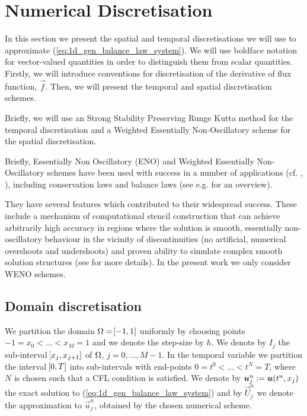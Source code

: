 \documentclass{amsart}
\theoremstyle{definition}
\theoremstyle{remark}
\numberwithin{equation}{section}
\begin{document}
\section{Numerical Discretisation}
In this section we present the spatial and temporal discretisations we will use to approximate (\ref{eq:1d_gen_balance_law_system}).   We will use boldface notation for  vector-valued quantities in order to distinguish them from scalar quantities.  Firstly, we will introduce conventions for discretisation of the derivative of flux function, $\vec{f}$.  Then, we will present the temporal and spatial discretisation schemes.  

Briefly, we will use an Strong Stability Preserving Runge Kutta method for the temporal discretisation and a Weighted Essentially Non-Oscillatory scheme for the spatial discretisation.  

Briefly, Essentially Non Oscillatory (ENO) and Weighted Essentially Non-Oscillatory schemes have been used with success in a number of applications (cf. \cite{jiang1996efficient}, \cite{shu1998essentially}), including conservation laws and balance laws (see e.g. \cite{shu2020essentially} for an overview).  

They have several features which contributed to their widespread success.  These include a mechanism of computational stencil construction that can achieve arbitrarily high accuracy in regions where the solution is smooth, essentially non-oscillatory behaviour in the vicinity of discontinuities (no artificial, numerical overshoots and undershoots) and proven ability to simulate complex smooth solution structures (see \cite{shu1998essentially} for more details).  In the present work we only consider WENO schemes.

\subsection{Domain discretisation}
We partition the domain $\Omega=\!\left[{-1,1}\right]$ uniformly by choosing points $-1=x_0<\dots<x_M=1$ and we denote the step-size by $h$.  We denote by $I_j$ the sub-interval $\!\left[{x_j,x_{j+1}}\right]$ of $\Omega$, $j=0,\dots,M-1$.  In the temporal variable we partition the interval $\!\left[{0,T}\right]$ into sub-intervals with end-points $0=t^0<\dots<t^N=T$, where $N$ is chosen such that a CFL condition is satisfied. We denote by $\boldsymbol{u}^n_j:=\boldsymbol{u}\!\left({t^n,x_j}\right)$ the exact solution to (\ref{eq:1d_gen_balance_law_system}) and by $\vec U^n_j$ we denote the approximation to $\vec u^n_j$, obtained by the chosen numerical scheme.
\end{document}
